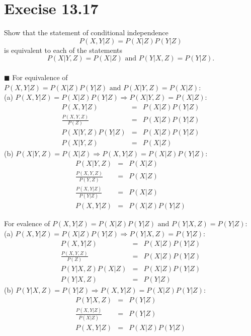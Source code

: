 \documentclass{article}
\newcommand{\solution}[1]{~\\ $\blacksquare$ \sffamily\upshape\selectfont #1
\normalfont ~\\~ }
\begin{document}
\section{Execise 13.17}
Show that the statement of conditional independence
\[ P(X,Y|Z)=P(X|Z)P(Y|Z) \]
is equivalent to each of the statements
\[ P(X|Y,Z)=P(X|Z) \mbox{ and } P(Y|X,Z)=P(Y|Z). \]
\solution{
  For equivalence of $P(X,Y|Z)=P(X|Z)P(Y|Z) \mbox{ and }
  P(X|Y,Z)=P(X|Z)$:  \\  
  (a) $P(X,Y|Z)=P(X|Z)P(Y|Z) \Longrightarrow P(X|Y,Z)=P(X|Z)$:
  \begin{eqnarray*}
    P(X,Y|Z) & = & P(X|Z)P(Y|Z) \\ 
    \frac{P(X,Y,Z)}{P(Z)} & = & P(X|Z)P(Y|Z) \\
    P(X|Y,Z)P(Y|Z) & = & P(X|Z)P(Y|Z) \\
    P(X|Y,Z) & = & P(X|Z)
  \end{eqnarray*}
  (b) $P(X|Y,Z)=P(X|Z) \Longrightarrow P(X,Y|Z)=P(X|Z)P(Y|Z)$: 
  \begin{eqnarray*}
    P(X|Y,Z) & = & P(X|Z) \\ 
    \frac{P(X,Y,Z)}{P(Y,Z)} & = & P(X|Z) \\
    \frac{P(X,Y|Z)}{P(Y|Z)} & = & P(X|Z) \\ 
    P(X,Y|Z) & = & P(X|Z)P(Y|Z)
  \end{eqnarray*}
  
  For evalence of $P(X,Y|Z)=P(X|Z)P(Y|Z) \mbox{ and }
  P(Y|X,Z)=P(Y|Z)$: \\   
  (a) $P(X,Y|Z)=P(X|Z)P(Y|Z) \Longrightarrow P(Y|X,Z)=P(Y|Z)$:  
  \begin{eqnarray*}
    P(X,Y|Z) & = & P(X|Z)P(Y|Z) \\
    \frac{P(X,Y,Z)}{P(Z)} & = & P(X|Z)P(Y|Z) \\
    P(Y|X,Z)P(X|Z) & = & P(X|Z)P(Y|Z) \\
    P(Y|X,Z) & = & P(Y|Z) 
  \end{eqnarray*}
  (b) $P(Y|X,Z)=P(Y|Z) \Longrightarrow P(X,Y|Z)=P(X|Z)P(Y|Z)$:  
  \begin{eqnarray*}
    P(Y|X,Z) & = & P(Y|Z) \\
    \frac{P(X,Y|Z)}{P(X|Z)} & = & P(Y|Z) \\
    P(X,Y|Z) & = & P(X|Z)P(Y|Z) 
  \end{eqnarray*}
}
\end{document}
